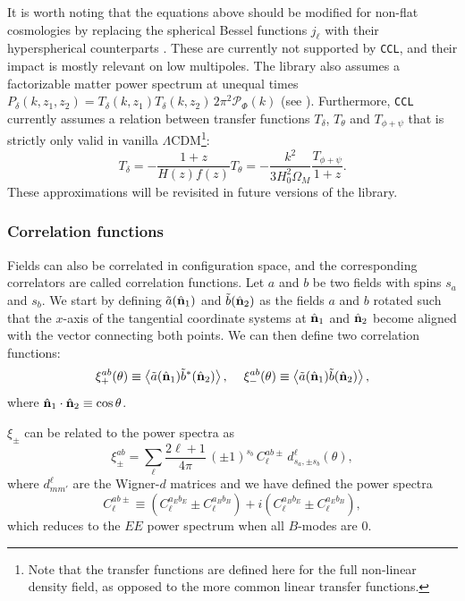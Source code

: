 \documentclass[\docopts]{\docclass}
\newcommand{\nv}{\hat{\bf n}}
\newcommand{\ccl}{{\tt CCL}\xspace}
\begin{document}
\noindent
It is worth noting that the equations above should be modified for non-flat cosmologies by replacing the spherical Bessel functions $j_\ell$ with their hyperspherical counterparts \citep{1994ApJ...432....7K}. These are currently not supported by \ccl, and their impact is mostly relevant on low multipoles. The library also assumes a factorizable matter power spectrum at unequal times $P_\delta(k,z_1,z_2)=T_\delta(k,z_1)T_\delta(k,z_2)\,2\pi^2\mathcal{P}_\Phi(k)$ (see \citealt{2017PhRvD..95f3522K}). Furthermore, \ccl currently assumes a relation between transfer functions $T_\delta$, $T_\theta$ and $T_{\phi+\psi}$ that is strictly only valid in vanilla $\Lambda$CDM\footnote{Note that the transfer functions are defined here for the full non-linear density field, as opposed to the more common linear transfer functions.}:
\begin{equation}
  T_\delta=-\frac{1+z}{H(z)f(z)}T_\theta=-\frac{k^2}{3H_0^2\Omega_M}\frac{T_{\phi+\psi}}{1+z}.
\end{equation}
These approximations will be revisited in future versions of the library.


\subsubsection{Correlation functions}

Fields can also be correlated in configuration space, and the corresponding correlators are called correlation functions. Let $a$ and $b$ be two fields with spins $s_a$ and $s_b$. We start by defining $\tilde{a}(\nv_1)$ and $\tilde{b}(\nv_2)$ as the fields $a$ and $b$ rotated such that the $x$-axis of the tangential coordinate systems at $\nv_1$ and $\nv_2$ become aligned with the vector connecting both points. We can then define two correlation functions:
\begin{equation}\nonumber
  \xi^{ab}_+(\theta)\equiv\left\langle\tilde{a}(\nv_1)\tilde{b}^*(\nv_2)\right\rangle,\hspace{12pt}
  \xi^{ab}_-(\theta)\equiv\left\langle\tilde{a}(\nv_1)\tilde{b}(\nv_2)\right\rangle,
  \label{eq:xipm}
\end{equation}
where $\nv_1\cdot\nv_2\equiv\cos\theta$. 

$\xi_{\pm}$ can be related to the power spectra as
\begin{equation}\label{eq:cl_xi}
 \xi^{ab}_\pm = \sum_\ell\frac{2\ell+1}{4\pi}\,(\pm1)^{s_b}\,C^{ab\pm}_\ell\,d^\ell_{s_a,\pm s_b}(\theta),
\end{equation}
where $d^\ell_{mm'}$ are the Wigner-$d$ matrices \citep{Ng1999,2004MNRAS.350..914C} and we have defined the power spectra
\begin{equation}
  C^{ab\pm}_\ell\equiv\left(C^{a_Eb_E}_\ell\pm C^{a_Bb_B}_\ell\right)+i\left(C^{a_Bb_E}_\ell\pm C^{a_Eb_B}_\ell\right),
\end{equation}
which reduces to the $EE$ power spectrum when all $B$-modes are 0.
\end{document}
